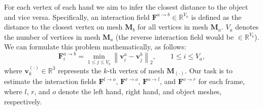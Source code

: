 \documentclass[10pt,twocolumn,letterpaper]{article}
\begin{document}
\begin{table}[t]
\centering
{}
\caption{\textbf{Evaluation of text-driven 6DoF object pose forecasting.} Reported are per-object and mean average translation errors (mm, $\downarrow$), with and without text conditioning.
Conditioning on text leads to a consistent improvement across objects.
}
\label{tab:show3d_text_vs_notext_mean}
\end{table}

 For each vertex of each hand we aim to infer the closest distance to the object and vice versa. Specifically, an interaction field $\mathbf{F}^{a \rightarrow b} \in \mathbb{R}^{V_a}$ is defined as the distance to the closest vertex on mesh $\mathbf{M}_b$ for all vertices in mesh $\mathbf{M}_a$. $V_a$ denotes the number of vertices in mesh $\mathbf{M}_a$ (the reverse interaction field would be $\in \mathbb{R}^{V_b}$). We can formulate this problem mathematically, as follows:
\begin{equation}
\mathbf{F}^{a \rightarrow b}_i = \min_{1 \leq j \leq V_b} \left\lVert \mathbf{v}^a_i - \mathbf{v}^b_j \right\rVert_2, 
\qquad 1 \leq i \leq V_a,
\end{equation}
where $\mathbf{v}^{(\cdot)}_k \in \mathbb{R}^3$ represents the $k$-th vertex of mesh $\mathbf{M}_{(\cdot)}$. Our task is to estimate the interaction fields $\mathbf{F}^{l \rightarrow o}$, $\mathbf{F}^{r \rightarrow o}$, $\mathbf{F}^{o \rightarrow l}$, and $\mathbf{F}^{o \rightarrow r}$ for each frame, where $l$, $r$, and $o$ denote the left hand, right hand, and object meshes, respectively.
\end{document}
